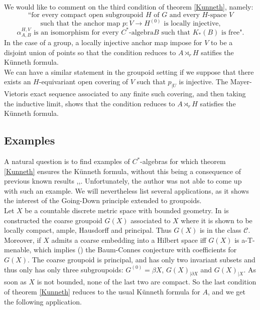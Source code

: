 \begin{rk}
We would like to comment on the third condition of theorem \ref{Kunneth}, namely:
\[\text{``for every compact open subgroupoid }H \text{ of } G \text{ and every }H \text{-space }V \]
\[\text{ such that the anchor map }p : V \rightarrow H^{(0)}\text{ is locally injective, }\]
\[\alpha_{A,B}^{H,V}\text{ is an isomorphism for every } C^*\text{-algebra} B \text{ such that $K_*(B)$ is free".}\]
In the case of a group, a locally injective anchor map impose for $V$ to be a disjoint union of points so that the condition reduces to $A\rtimes_r H$ satifies the Künneth formula. \\

We can have a similar statement in the groupoid setting if we suppose that there exists an $H$-equivariant open covering of $V$ such that $p_{|U}$ is injective. The Mayer-Vietoris exact sequence associated to any finite such covering, and then taking the inductive limit, shows that the condition reduces to $A\rtimes_r H$ satisfies the Künneth formula.  
\end{rk}


\subsection{Examples}

A natural question is to find examples of $C^*$-algebras for which theorem \ref{Kunneth} ensures the Künneth formula, without this being a consequence of previous known results \cite{RosenbergKunneth},\cite{ChabertEOY},\cite{OY4}. Unfortunately, the author was not able to come up with such an example. We will nevertheless list several applications, as it shows the interest of the Going-Down principle extended to groupoids.\\

Let $X$ be a countable discrete metric space with bounded geometry. In \cite{SkTuYu} is constructed the coarse groupoid $G(X)$ associated to $X$ where it is shown to be locally compact, ample, Hausdorff and principal. Thus $G(X)$ is in the class $\mathcal C$. Moreover, if $X$ admits a coarse embedding into a Hilbert space iff $G(X)$ is a-T-menable, which implies (\cite{TuThese}) the Baum-Connes conjecture with coefficients for $G(X)$. The coarse groupoid is principal, and has only two invariant subsets and thus only has only three subgroupoids: $G^{(0)}= \beta X$, $G(X)_{|\partial X}$ and $G(X)_{|X}$. As soon as $X$ is not bounded, none of the last two are compact. So the last condition of theorem \ref{Kunneth} reduces to the usual Künneth formula for $A$, and we get the following application. \\

